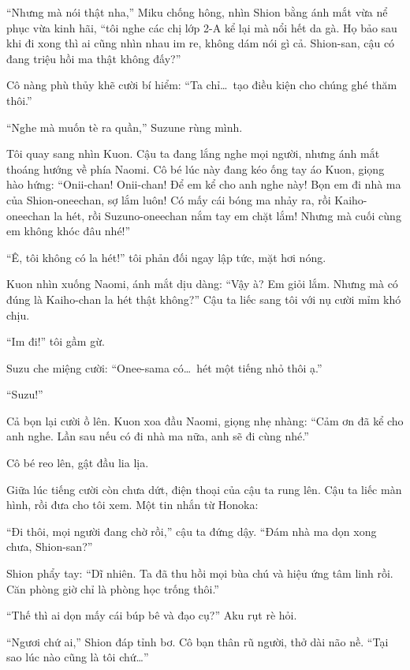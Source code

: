 \documentclass[../main.tex]{subfiles}
\begin{document}
``Nhưng mà nói thật nha,'' Miku chống hông, nhìn Shion bằng ánh mắt vừa nể phục vừa kinh hãi, ``tôi nghe các chị lớp 2-A kể lại mà nổi hết da gà. Họ bảo sau khi đi xong thì ai cũng nhìn nhau im re, không dám nói gì cả. Shion-san, cậu có đang triệu hồi ma thật không đấy?''

Cô nàng phù thủy khẽ cười bí hiểm: ``Ta chỉ\dots\ tạo điều kiện cho chúng ghé thăm thôi.''

``Nghe mà muốn tè ra quần,'' Suzune rùng mình.

Tôi quay sang nhìn Kuon. Cậu ta đang lắng nghe mọi người, nhưng ánh mắt thoáng hướng về phía Naomi. Cô bé lúc này đang kéo ống tay áo Kuon, giọng hào hứng: ``Onii-chan! Onii-chan! Để em kể cho anh nghe này! Bọn em đi nhà ma của Shion-oneechan, sợ lắm luôn! Có mấy cái bóng ma nhảy ra, rồi Kaiho-oneechan la hét, rồi Suzuno-oneechan nắm tay em chặt lắm! Nhưng mà cuối cùng em không khóc đâu nhé!''

``Ê, tôi không có la hét!'' tôi phản đối ngay lập tức, mặt hơi nóng.

Kuon nhìn xuống Naomi, ánh mắt dịu dàng: ``Vậy à? Em giỏi lắm. Nhưng mà có đúng là Kaiho-chan la hét thật không?'' Cậu ta liếc sang tôi với nụ cười mỉm khó chịu.

``Im đi!'' tôi gầm gừ.

Suzu che miệng cười: ``Onee-sama có\dots\ hét một tiếng nhỏ thôi ạ.''

``Suzu!''

Cả bọn lại cười ồ lên. Kuon xoa đầu Naomi, giọng nhẹ nhàng: ``Cảm ơn đã kể cho anh nghe. Lần sau nếu có đi nhà ma nữa, anh sẽ đi cùng nhé.''

Cô bé reo lên, gật đầu lia lịa.

Giữa lúc tiếng cười còn chưa dứt, điện thoại của cậu ta rung lên. Cậu ta liếc màn hình, rồi đưa cho tôi xem. Một tin nhắn từ Honoka:


``Đi thôi, mọi người đang chờ rồi,'' cậu ta đứng dậy. ``Đám nhà ma dọn xong chưa, Shion-san?''

Shion phẩy tay: ``Dĩ nhiên. Ta đã thu hồi mọi bùa chú và hiệu ứng tâm linh rồi. Căn phòng giờ chỉ là phòng học trống thôi.''

``Thế thì ai dọn mấy cái búp bê và đạo cụ?'' Aku rụt rè hỏi.

``Ngươi chứ ai,'' Shion đáp tỉnh bơ. Cô bạn thân rũ người, thở dài não nề. ``Tại sao lúc nào cũng là tôi chứ\dots''
\end{document}
